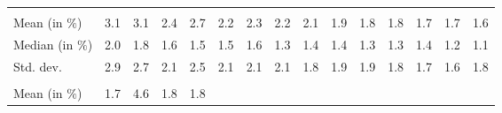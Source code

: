 \begin{tabular}{lllllllllllllll}
  \multicolumn{1}{r}{} &
  \multicolumn{1}{r}{} &
  \multicolumn{1}{r}{} &
  \multicolumn{1}{r}{} &
  \multicolumn{1}{r}{} &
  \multicolumn{1}{r}{} &
  \multicolumn{1}{r}{} &
  \multicolumn{1}{r}{} &
  \multicolumn{1}{r}{} &
  \multicolumn{1}{r}{} &
  \multicolumn{1}{r}{} \\
\multicolumn{1}{l}{\hspace{2em}Mean (in $\%$)} &
  \multicolumn{1}{|r}{3.1} &
  \multicolumn{1}{r}{3.1} &
  \multicolumn{1}{r}{2.4} &
  \multicolumn{1}{r}{2.7} &
  \multicolumn{1}{r}{2.2} &
  \multicolumn{1}{r}{2.3} &
  \multicolumn{1}{r}{2.2} &
  \multicolumn{1}{r}{2.1} &
  \multicolumn{1}{r}{1.9} &
  \multicolumn{1}{r}{1.8} &
  \multicolumn{1}{r}{1.8} &
  \multicolumn{1}{r}{1.7} &
  \multicolumn{1}{r}{1.7} &
  \multicolumn{1}{r}{1.6} \\
\multicolumn{1}{l}{\hspace{2em}Median (in $\%$)} &
  \multicolumn{1}{|r}{2.0} &
  \multicolumn{1}{r}{1.8} &
  \multicolumn{1}{r}{1.6} &
  \multicolumn{1}{r}{1.5} &
  \multicolumn{1}{r}{1.5} &
  \multicolumn{1}{r}{1.6} &
  \multicolumn{1}{r}{1.3} &
  \multicolumn{1}{r}{1.4} &
  \multicolumn{1}{r}{1.4} &
  \multicolumn{1}{r}{1.3} &
  \multicolumn{1}{r}{1.3} &
  \multicolumn{1}{r}{1.4} &
  \multicolumn{1}{r}{1.2} &
  \multicolumn{1}{r}{1.1} \\
\multicolumn{1}{l}{\hspace{2em}Std. dev.} &
  \multicolumn{1}{|r}{2.9} &
  \multicolumn{1}{r}{2.7} &
  \multicolumn{1}{r}{2.1} &
  \multicolumn{1}{r}{2.5} &
  \multicolumn{1}{r}{2.1} &
  \multicolumn{1}{r}{2.1} &
  \multicolumn{1}{r}{2.1} &
  \multicolumn{1}{r}{1.8} &
  \multicolumn{1}{r}{1.9} &
  \multicolumn{1}{r}{1.9} &
  \multicolumn{1}{r}{1.8} &
  \multicolumn{1}{r}{1.7} &
  \multicolumn{1}{r}{1.6} &
  \multicolumn{1}{r}{1.8} \\
\multicolumn{1}{l}{\hspace{1em}{\textit{Additive term} ($\widehat{t}/\widetilde{p}$)}} &
  \multicolumn{1}{|r}{} &
  \multicolumn{1}{r}{} &
  \multicolumn{1}{r}{} &
  \multicolumn{1}{r}{} &
  \multicolumn{1}{r}{} &
  \multicolumn{1}{r}{} &
  \multicolumn{1}{r}{} &
  \multicolumn{1}{r}{} &
  \multicolumn{1}{r}{} &
  \multicolumn{1}{r}{} &
  \multicolumn{1}{r}{} &
  \multicolumn{1}{r}{} &
  \multicolumn{1}{r}{} &
  \multicolumn{1}{r}{} \\
\multicolumn{1}{l}{\hspace{2em}Mean (in $\%$)} &
  \multicolumn{1}{|r}{1.7} &
  \multicolumn{1}{r}{4.6} &
  \multicolumn{1}{r}{1.8} &
  \multicolumn{1}{r}{1.8} &

\end{tabular}
